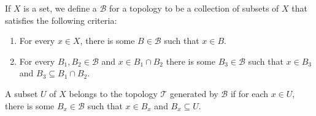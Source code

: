 \begin{dfn}\label{def: basis for a topology}
    If \( X \) is a set, we define a  \( \mathscr{B} \) for a topology to be a collection of subsets of \( X \) that satisfies the following criteria:
    \begin{enumerate}[label=\textbf{\roman*)}]
        \item For every \( x \in X \), there is some \( B \in \mathscr{B} \) such that \( x \in B \). 
        \item For every \( B_{1}, B_{2} \in \mathscr{B} \) and \( x \in B_{1} \cap B_{2} \) there is some \( B_{3} \in \mathscr{B} \) such that \( x \in B_{3} \) and \( B_{3} \subseteq B_{1} \cap B_{2} \). 
    \end{enumerate}
A subset \( U \) of \( X \) belongs to the topology  \( \mathscr{T} \) generated by \( \mathscr{B} \) if for each \( x \in U \), there is some \( B_{x} \in \mathscr{B} \) such that \( x \in B_{x} \) and \( B_{x} \subseteq U \).
\end{dfn}

